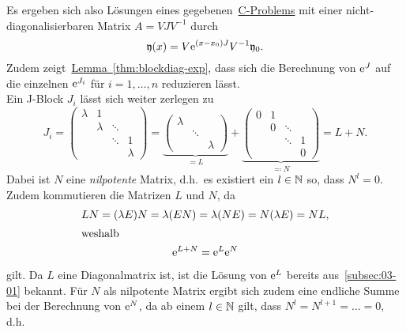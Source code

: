 Es ergeben sich also Lösungen eines gegebenen~\hyperref[eq:cp]{C-Problems} mit einer nicht-diagonalisierbaren Matrix $A = V J V^{-1}$ durch
\begin{equation*}
    \mathfrak{y}(x) = V \mathrm{e}^{(x - x_0) J} V^{-1} \mathfrak{y}_0.
\end{equation*}
Zudem zeigt~\hyperref[thm:blockdiag-exp]{Lemma~\ref*{thm:blockdiag-exp}},
dass sich die Berechnung von $\mathrm{e}^J$ auf die einzelnen $\mathrm{e}^{J_i}$ für $i = 1,\dots,n$ reduzieren lässt.\\
Ein J-Block $J_i$ lässt sich weiter zerlegen zu
\begin{equation*}
    J_i = \begin{pmatrix}
              \lambda & 1       &        & \\
                      & \lambda & \ddots & \\
                      &         & \ddots & 1 \\
                      &         &        & \lambda
    \end{pmatrix}
    = \underbrace{\begin{pmatrix}
        \lambda &        & \\
                & \ddots & \\
                &        & \lambda
    \end{pmatrix}}_{= L}
    + \underbrace{\begin{pmatrix}
          0 & 1 &        & \\
            & 0 & \ddots & \\
            &   & \ddots & 1 \\
            &   &        & 0
    \end{pmatrix}}_{\eqqcolon N}
    = L + N.
\end{equation*}
Dabei ist $N$ eine \emph{nilpotente} Matrix, d.h.\ es existiert ein $l \in \mathbb{N}$ so, dass $N^l = 0$.
Zudem kommutieren die Matrizen $L$ und $N$, da
\begin{gather*}
    L N = (\lambda E) N = \lambda (EN) = \lambda (NE) = N (\lambda E) = N L,\\
    \intertext{weshalb}
    \mathrm{e}^{L + N} = \mathrm{e}^L \mathrm{e}^N
\end{gather*}
gilt.
Da $L$ eine Diagonalmatrix ist, ist die Lösung von $\mathrm{e}^L$ bereits aus~\autoref{subsec:03-01} bekannt.
Für $N$ als nilpotente Matrix ergibt sich zudem eine endliche Summe bei der Berechnung von $\mathrm{e}^N$,
da ab einem $l \in \mathbb{N}$ gilt, dass $N^l = N^{l+1} = \dots = 0$, d.h.
